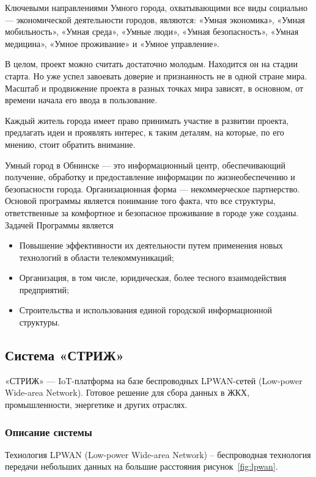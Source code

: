 Ключевыми направлениями Умного города, охватывающими все виды социально --- экономической деятельности городов, являются: «Умная экономика», «Умная мобильность», «Умная среда», «Умные люди», «Умная безопасность», «Умная медицина», «Умное проживание» и «Умное управление». 

В целом, проект можно считать достаточно молодым. Находится он на стадии старта. Но уже успел завоевать доверие и признанность не в одной стране мира. Масштаб и продвижение проекта в разных точках мира зависят, в основном, от времени начала его ввода в пользование. 

Каждый житель города имеет право принимать участие в развитии проекта, предлагать идеи и проявлять интерес, к таким деталям, на которые, по его мнению, стоит обратить внимание. 

Умный город в Обнинске --- это информационный центр, обеспечивающий получение, обработку и предоставление информации по жизнеобеспечению и безопасности города. Организационная форма --- некоммерческое партнерство. Основой программы является понимание того факта, что все структуры, ответственные за комфортное и безопасное проживание в городе уже созданы. Задачей Программы является 
\begin{itemize}
	\item Повышение эффективности их деятельности путем применения новых технологий в области телекоммуникаций; 	
	\item Организация, в том числе, юридическая, более тесного взаимодействия предприятий; 
	\item Строительства и использования единой городской информационной структуры.
\end{itemize}

\subsection{Система «СТРИЖ»}
«СТРИЖ» — IoT-платформа на базе беспроводных LPWAN-сетей (Low-power Wide-area Network). Готовое решение для сбора данных в ЖКХ, промышленности, энергетике и других отраслях. \cite{strij}
\subsubsection{Описание системы}
Технология LPWAN (Low-power Wide-area Network) – беспроводная технология передачи небольших данных на большие расстояния рисунок~\ref{fig:lpwan}. 

